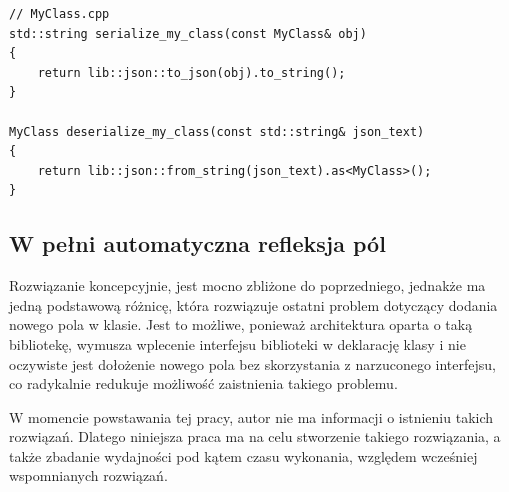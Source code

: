 \documentclass[12pt]{article}
\newcommand{\n}{\newline}
\begin{document}
{{{\begin{lstlisting}[frame=single]
// MyClass.cpp
std::string serialize_my_class(const MyClass& obj)
{
	return lib::json::to_json(obj).to_string();
}

MyClass deserialize_my_class(const std::string& json_text)
{
	return lib::json::from_string(json_text).as<MyClass>();
}
				\end{lstlisting}
			}
		}

		{
			\subsection{W pełni automatyczna refleksja pól}

			Rozwiązanie koncepcyjnie, jest mocno zbliżone do poprzedniego, jednakże ma jedną podstawową różnicę, która rozwiązuje ostatni
			problem dotyczący dodania nowego pola w klasie. Jest to możliwe, ponieważ architektura oparta o taką bibliotekę, wymusza wplecenie
			interfejsu biblioteki w deklarację klasy i nie oczywiste jest dołożenie nowego pola bez skorzystania z narzuconego interfejsu, co
			radykalnie redukuje możliwość zaistnienia takiego problemu.\n

			W momencie powstawania tej pracy, autor nie ma informacji o istnieniu takich rozwiązań. Dlatego niniejsza praca ma na celu
			stworzenie takiego rozwiązania, a także zbadanie wydajności pod kątem czasu wykonania, względem wcześniej wspomnianych rozwiązań.
		}
	}
\end{document}

